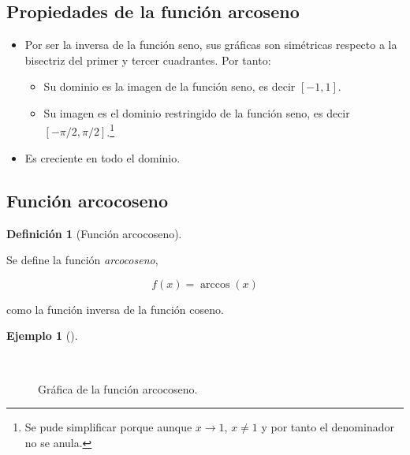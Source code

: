 \documentclass[
  a4paper,
]{scrreport}
\providecommand{\tightlist}{%
  \setlength{\itemsep}{0pt}\setlength{\parskip}{0pt}}\usepackage{longtable,booktabs,array}
\theoremstyle{plain}
\theoremstyle{plain}
\theoremstyle{definition}
\newtheorem{definition}{Definición}[chapter]
\theoremstyle{definition}
\newtheorem{example}{Ejemplo}[chapter]
\theoremstyle{plain}
\theoremstyle{remark}
\begin{document}
\hypertarget{propiedades-de-la-funciuxf3n-arcoseno}{%
\subsection{Propiedades de la función
arcoseno}\label{propiedades-de-la-funciuxf3n-arcoseno}}

\begin{itemize}
\tightlist
\item
  Por ser la inversa de la función seno, sus gráficas son simétricas
  respecto a la bisectriz del primer y tercer cuadrantes. Por tanto:

  \begin{itemize}
  \tightlist
  \item
    Su dominio es la imagen de la función seno, es decir \([-1,1]\).
  \item
    Su imagen es el dominio restringido de la función seno, es decir
    \([-\pi/2,\pi/2]\).\footnote{Se pude simplificar porque aunque
      \(x\to 1\), \(x\neq 1\) y por tanto el denominador no se anula.}
  \end{itemize}
\item
  Es creciente en todo el dominio.
\end{itemize}

\hypertarget{funciuxf3n-arcocoseno}{%
\subsection{Función arcocoseno}\label{funciuxf3n-arcocoseno}}

\leavevmode{}%
\begin{definition}[Función arcocoseno]\label{def-funcion-arcocoseno}

Se define la función \emph{arcocoseno},

\[f(x)=\operatorname{arccos}(x)\]

como la función inversa de la función coseno.

\end{definition}

\leavevmode{}%
\begin{example}[]\label{exm-funcion-arcocoseno}

~

\begin{figure}

{\centering 



}

\caption{Gráfica de la función arcocoseno.}

\end{figure}

\end{example}
\end{document}
